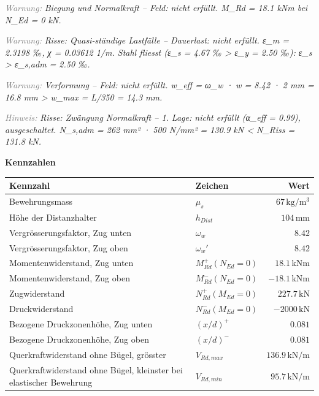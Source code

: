 \documentclass[11pt,a4paper]{article}
\newcommand{\hinweis}[2]{\par\noindent\textcolor{gray}{\textit{#1:}} \textit{#2}\par}
\begin{document}
\hinweis{Warnung}{Biegung und Normalkraft – Feld: nicht erfüllt. M\_Rd = 18.1 kNm bei N\_Ed = 0 kN.}
\hinweis{Warnung}{Risse: Quasi-ständige Lastfälle – Dauerlast: nicht erfüllt. ε\_m = 2.3198 ‰, χ = 0.03612 1/m. Stahl fliesst (ε\_s = 4.67 ‰ > ε\_y = 2.50 ‰): ε\_s > ε\_s,adm = 2.50 ‰.}
\hinweis{Warnung}{Verformung – Feld: nicht erfüllt. w\_eff = ω\_w · w = 8.42 · 2 mm = 16.8 mm > w\_max = L/350 = 14.3 mm.}
\hinweis{Hinweis}{Risse: Zwängung Normalkraft – 1. Lage: nicht erfüllt (α\_eff = 0.99), ausgeschaltet. N\_s,adm = 262 mm² · 500 N/mm² = 130.9 kN < N\_Riss = 131.8 kN.}
\noindent\textbf{Kennzahlen}
\begin{longtable}{llr}
\hline
Kennzahl & Zeichen & Wert \\
\hline
\endhead
Bewehrungsmass & $\mu_s$ & $67\,\mathrm{kg}/\mathrm{m}^{3}$ \\
Höhe der Distanzhalter & $h_{Dist}$ & $104\,\mathrm{mm}$ \\
Vergrösserungsfaktor, Zug unten & $\omega_w$ & $8.42$ \\
Vergrösserungsfaktor, Zug oben & $\omega_w'$ & $8.42$ \\
Momentenwiderstand, Zug unten & $M_{Rd}^{+}(N_{Ed} = 0)$ & $18.1\,\mathrm{kNm}$ \\
Momentenwiderstand, Zug oben & $M_{Rd}^{-}(N_{Ed} = 0)$ & $-18.1\,\mathrm{kNm}$ \\
Zugwiderstand & $N_{Rd}^{+}(M_{Ed} = 0)$ & $227.7\,\mathrm{kN}$ \\
Druckwiderstand & $N_{Rd}^{-}(M_{Ed} = 0)$ & $-2000\,\mathrm{kN}$ \\
Bezogene Druckzonenhöhe, Zug unten & $\left(x/d\right)^{+}$ & $0.081$ \\
Bezogene Druckzonenhöhe, Zug oben & $\left(x/d\right)^{-}$ & $0.081$ \\
Querkraftwiderstand ohne Bügel, grösster & $V_{Rd,max}$ & $136.9\,\mathrm{kN}/\mathrm{m}$ \\
Querkraftwiderstand ohne Bügel, kleinster bei elastischer Bewehrung & $V_{Rd,min}$ & $95.7\,\mathrm{kN}/\mathrm{m}$ \\
\hline
\end{longtable}
\end{document}
